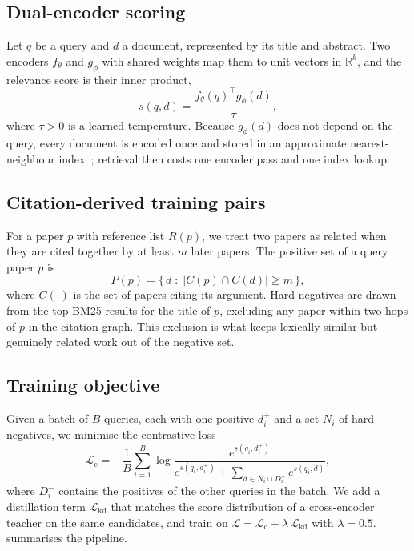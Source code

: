 \documentclass[10pt, twoside]{article}
\begin{document}
\subsection{Dual-encoder scoring}

Let $q$ be a query and $d$ a document, represented by its title and abstract.
Two encoders $f_\theta$ and $g_\phi$ with shared weights map them to unit
vectors in $\mathbb{R}^{k}$, and the relevance score is their inner product,
\begin{equation}
  s(q, d) = \frac{f_\theta(q)^{\top} g_\phi(d)}{\tau},
  \label{eq:score}
\end{equation}
where $\tau > 0$ is a learned temperature. Because $g_\phi(d)$ does not depend
on the query, every document is encoded once and stored in an approximate
nearest-neighbour index~\cite{varga2024ann}; retrieval then costs one encoder
pass and one index lookup.

\subsection{Citation-derived training pairs}

For a paper $p$ with reference list $R(p)$, we treat two papers as related when
they are cited together by at least $m$ later papers. The positive set of a
query paper $p$ is
\begin{equation}
  P(p) = \bigl\{\, d \;:\; \lvert C(p) \cap C(d) \rvert \ge m \,\bigr\},
  \label{eq:positives}
\end{equation}
where $C(\cdot)$ is the set of papers citing its argument. Hard negatives are
drawn from the top BM25 results for the title of $p$, excluding any paper
within two hops of $p$ in the citation graph. This exclusion is what keeps
lexically similar but genuinely related work out of the negative set.

\subsection{Training objective}

Given a batch of $B$ queries, each with one positive $d^{+}_i$ and a set
$N_i$ of hard negatives, we minimise the contrastive loss
\begin{equation}
  \mathcal{L}_{\text{c}} = -\frac{1}{B}\sum_{i=1}^{B}
  \log \frac{e^{s(q_i, d^{+}_i)}}
  {e^{s(q_i, d^{+}_i)} + \sum_{d \in N_i \cup D^{-}_i} e^{s(q_i, d)}},
  \label{eq:loss}
\end{equation}
where $D^{-}_i$ contains the positives of the other queries in the batch. We
add a distillation term $\mathcal{L}_{\text{kd}}$ that matches the score
distribution of a cross-encoder teacher on the same candidates, and train on
$\mathcal{L} = \mathcal{L}_{\text{c}} + \lambda\,\mathcal{L}_{\text{kd}}$ with
$\lambda = 0.5$.  summarises the pipeline.
\end{document}
